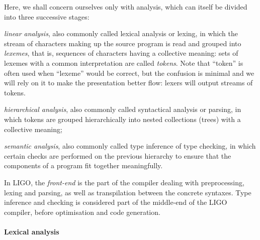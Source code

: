 \documentclass[12pt,a4paper]{article}
\begin{document}
Here, we shall concern ourselves only with analysis, which can itself
be divided into three successive stages:
\begin{enumerate*}

  \item \emph{linear analysis}, also commonly called lexical analysis
    or lexing, in which the stream of characters making up the source
    program is read and grouped into \emph{lexemes}, that is,
    sequences of characters having a collective meaning: sets of
    lexemes with a common interpretation are called \emph{tokens}.
    Note that ``token'' is often used when ``lexeme'' would be
    correct, but the confusion is minimal and we will rely on it to
    make the presentation better flow: lexers will output streams of
    tokens.

  \item \emph{hierarchical analysis}, also commonly called syntactical
    analysis or parsing, in which tokens are grouped hierarchically
    into nested collections (trees) with a collective meaning;

  \item \emph{semantic analysis}, also commonly called type inference
    of type checking, in which certain checks are performed on the
    previous hierarchy to ensure that the components of a program fit
    together meaningfully.

\end{enumerate*}

In LIGO, the \emph{front\hyp{}end} is the part of the compiler dealing
with preprocessing, lexing and parsing, as well as transpilation
between the concrete syntaxes. Type inference and checking is
considered part of the middle\hyp{}end of the LIGO compiler, before
optimisation and code generation.

\paragraph{Lexical analysis}
\end{document}
